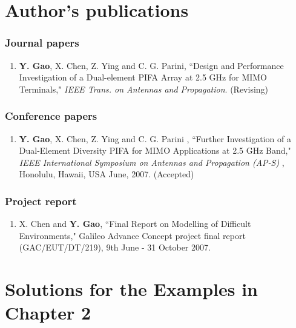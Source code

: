 \chapter{Author's publications}


\subsection*{Journal papers}
\begin{enumerate}
  \item \textbf{Y. Gao}, X. Chen, Z. Ying and C. G. Parini, ``Design and Performance
Investigation of a Dual-element PIFA Array at 2.5 GHz for MIMO Terminals," \emph{IEEE Trans. on
Antennas and Propagation}. (Revising)

\end{enumerate}


\subsection*{Conference papers}


\begin{enumerate}
  \item \textbf{Y. Gao}, X. Chen, Z. Ying and C. G. Parini , ``Further Investigation of a
Dual-Element Diversity PIFA for MIMO Applications at 2.5 GHz Band," \emph{IEEE International
Symposium on Antennas and Propagation (AP-S)} , Honolulu, Hawaii, USA  June, 2007. (Accepted)
    
\end{enumerate}

\subsection*{Project report}
\begin{enumerate}
  \item X. Chen and \textbf{Y. Gao}, ``Final Report on Modelling of Difficult Environments,"
  Galileo Advance Concept project final report (GAC/EUT/DT/219), 9th June - 31 October 2007.
  
\end{enumerate}



\renewcommand{\thefigure}{B.\arabic{figure}}
\chapter{Solutions for the Examples in Chapter 2}
\label{examples_solutions}
